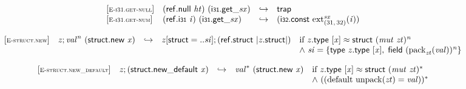 \vspace{1ex}

$$
\begin{array}{@{}l@{}lcl@{}l@{}}
{[\textsc{\scriptsize E{-}i31.get{-}null}]} \quad & (\mathsf{ref.null}~{\mathit{ht}})~({{\mathsf{i{\scriptstyle31}.get}}{\mathsf{\_}}}{{\mathit{sx}}}) &\hookrightarrow& \mathsf{trap} &  \\
{[\textsc{\scriptsize E{-}i31.get{-}num}]} \quad & (\mathsf{ref.i{\scriptstyle31}}~{\mathit{i}})~({{\mathsf{i{\scriptstyle31}.get}}{\mathsf{\_}}}{{\mathit{sx}}}) &\hookrightarrow& (\mathsf{i{\scriptstyle32}}.\mathsf{const}~{{{{\mathrm{ext}}}_{(31,\, 32)}^{{\mathit{sx}}}}}{({\mathit{i}})}) &  \\
\end{array}
$$

\vspace{1ex}

$$
\begin{array}{@{}l@{}lcl@{}l@{}}
{[\textsc{\scriptsize E{-}struct.new}]} \quad & {\mathit{z}} ; {{\mathit{val}}^{{\mathit{n}}}}~(\mathsf{struct.new}~{\mathit{x}}) &\hookrightarrow& {\mathit{z}}{}[\mathsf{struct} = ..{\mathit{si}}] ; (\mathsf{ref.struct}~{|{\mathit{z}}.\mathsf{struct}|}) &\quad
  \mbox{if}~{\mathit{z}}.\mathsf{type}~{}[{\mathit{x}}] \approx \mathsf{struct}~{({\mathit{mut}}~{\mathit{zt}})^{{\mathit{n}}}} \\
 &&&&\quad {\land}~{\mathit{si}} = \{ \begin{array}[t]{@{}l@{}}
\mathsf{type}~{\mathit{z}}.\mathsf{type}~{}[{\mathit{x}}],\; \mathsf{field}~{({{\mathrm{pack}}}_{{\mathit{zt}}}({\mathit{val}}))^{{\mathit{n}}}} \}\end{array} \\
\end{array}
$$

$$
\begin{array}{@{}l@{}lcl@{}l@{}}
{[\textsc{\scriptsize E{-}struct.new\_default}]} \quad & {\mathit{z}} ; (\mathsf{struct.new\_default}~{\mathit{x}}) &\hookrightarrow& {{\mathit{val}}^\ast}~(\mathsf{struct.new}~{\mathit{x}}) &\quad
  \mbox{if}~{\mathit{z}}.\mathsf{type}~{}[{\mathit{x}}] \approx \mathsf{struct}~{({\mathit{mut}}~{\mathit{zt}})^\ast} \\
 &&&&\quad {\land}~(({\mathrm{default}}~{\mathrm{unpack}}({\mathit{zt}}) = {\mathit{val}}))^\ast \\
\end{array}
$$

\vspace{1ex}

